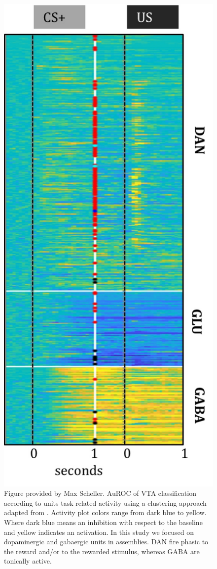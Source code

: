 \begin{framed}
\begin{figure}[H]
  \centering
    \includegraphics[scale=0.57]{figures/ClassificationUnits.pdf}
   \caption{Figure provided by Max Scheller. AuROC of VTA classification according to units task related activity using a clustering approach adapted from \cite{Uchida}. Activity plot colors range from dark blue to yellow. Where dark blue means an inhibition with respect to the baseline and yellow indicates an activation. In this study we focused on dopaminergic and gabaergic units in assemblies. DAN fire phasic to the reward and/or to the rewarded stimulus, whereas GABA are tonically active.}
    \label{fig:ClassificatonVTA}
\end{figure}
\end{framed}
